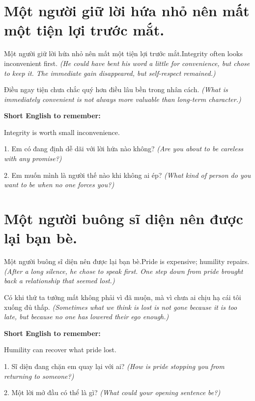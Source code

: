 \section{Một người giữ lời hứa nhỏ nên mất một tiện lợi trước mắt.}
\begin{truyen}{Một người giữ lời hứa nhỏ nên mất một tiện lợi trước mắt.}{Integrity often looks inconvenient first.}
\textit{(He could have bent his word a little for convenience, but chose to keep it. The immediate gain disappeared, but self-respect remained.)}
\end{truyen}
\begin{baihoc}
Điều ngay tiện chưa chắc quý hơn điều lâu bền trong nhân cách.
\textit{(What is immediately convenient is not always more valuable than long-term character.)}
\end{baihoc}
\begin{ghinhoanh}\textbf{Short English to remember:}

Integrity is worth small inconvenience.
\end{ghinhoanh}
\begin{tuhocnhanh}
1. Em có đang định dễ dãi với lời hứa nào không? \textit{(Are you about to be careless with any promise?)}

2. Em muốn mình là người thế nào khi không ai ép? \textit{(What kind of person do you want to be when no one forces you?)}
\end{tuhocnhanh}
\ngancach

\section{Một người buông sĩ diện nên được lại bạn bè.}
\begin{truyen}{Một người buông sĩ diện nên được lại bạn bè.}{Pride is expensive; humility repairs.}
\textit{(After a long silence, he chose to speak first. One step down from pride brought back a relationship that seemed lost.)}
\end{truyen}
\begin{baihoc}
Có khi thứ ta tưởng mất không phải vì đã muộn, mà vì chưa ai chịu hạ cái tôi xuống đủ thấp.
\textit{(Sometimes what we think is lost is not gone because it is too late, but because no one has lowered their ego enough.)}
\end{baihoc}
\begin{ghinhoanh}\textbf{Short English to remember:}

Humility can recover what pride lost.
\end{ghinhoanh}
\begin{tuhocnhanh}
1. Sĩ diện đang chặn em quay lại với ai? \textit{(How is pride stopping you from returning to someone?)}

2. Một lời mở đầu có thể là gì? \textit{(What could your opening sentence be?)}
\end{tuhocnhanh}
\ngancach